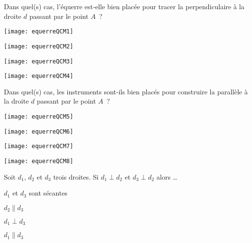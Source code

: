 \begin{QCM}
\begin{GroupeQCM}
    \begin{exercice}
     Dans quel(s) cas, l'équerre est‑elle bien placée pour tracer la perpendiculaire à la droite $d$ passant par le point $A$ ?
      \begin{ChoixQCM}{4}
      \item \texttt{[image: equerreQCM1]}
      \item \texttt{[image: equerreQCM2]}
      \item \texttt{[image: equerreQCM3]}
      \item \texttt{[image: equerreQCM4]}
      \end{ChoixQCM}
\begin{corrige}
   \end{corrige}
    \end{exercice}


    \begin{exercice}
     Dans quel(s) cas, les instruments sont‑ils bien placés pour construire la parallèle à la droite $d$ passant par le point $A$ ?
      \begin{ChoixQCM}{4}
      \item \texttt{[image: equerreQCM5]}
      \item \texttt{[image: equerreQCM6]}
      \item \texttt{[image: equerreQCM7]}
      \item \texttt{[image: equerreQCM8]}
      \end{ChoixQCM}
\begin{corrige}
   \end{corrige}
    \end{exercice}
    
  
    \begin{exercice}
     Soit $d_1$, $d_2$ et $d_3$ trois droites. Si $d_1 \perp d_2$ et $d_3 \perp d_2$ alors \ldots
      \begin{ChoixQCM}{4}
      \item $d_1$ et $d_3$ sont sécantes
      \item $d_2 \parallel d_3$
      \item $d_1 \perp d_3$
      \item $d_1 \parallel d_3$
      \end{ChoixQCM}
\begin{corrige}
   \end{corrige}
    \end{exercice}
    

\end{GroupeQCM}
\end{QCM}
